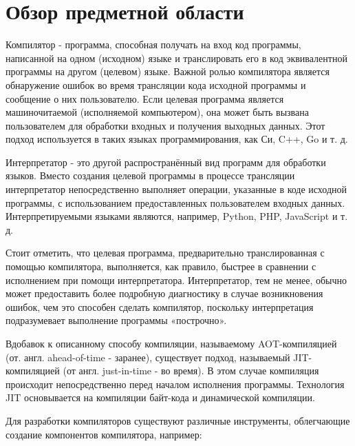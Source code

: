 \newpage
\section{Обзор предметной области}

Компилятор - программа, способная получать на вход код программы, написанной на одном (исходном) языке и транслировать его в код эквивалентной программы на другом (целевом) языке. Важной ролью компилятора является обнаружение ошибок во время трансляции кода исходной программы и сообщение о них пользователю. Если целевая программа является машиночитаемой (исполняемой компьютером), она может быть вызвана пользователем для обработки входных и получения выходных данных. Этот подход используется в таких языках программирования, как Си, C++, Go и т. д.

Интерпретатор - это другой распространённый вид программ для обработки языков. Вместо создания целевой программы в процессе трансляции интерпретатор непосредственно выполняет операции, указанные в коде исходной программы, с использованием предоставленных пользователем входных данных. Интерпретируемыми языками являются, например, Python, PHP, JavaScript и т. д.

Стоит отметить, что целевая программа, предварительно транслированная с помощью компилятора, выполняется, как правило, быстрее в сравнении с исполнением при помощи интерпретатора. Интерпретатор, тем не менее, обычно может предоставить более подробную диагностику в случае возникновения ошибок, чем это способен сделать компилятор, поскольку интерпретация подразумевает выполнение программы «построчно».

Вдобавок к описанному способу компиляции, называемому AOT-компиляцией (от. англ. ahead-of-time - заранее), существует подход, называемый JIT-компиляцией (от англ. just-in-time - во время). В этом случае компиляция происходит непосредственно перед началом исполнения программы. Технология JIT основывается на компиляции байт-кода и динамической компиляции.

Для разработки компиляторов существуют различные инструменты, облегчающие создание компонентов компилятора, например:

